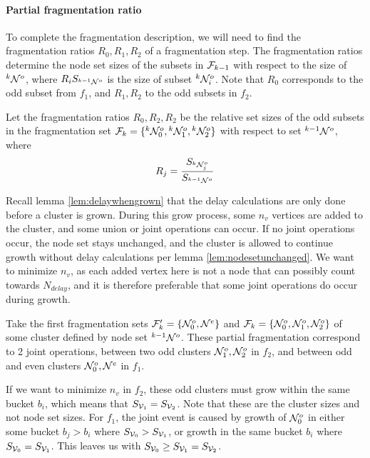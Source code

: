 \paragraph{Partial fragmentation ratio}
To complete the fragmentation description, we will need to find the fragmentation ratios $R_0, R_1, R_2$ of a fragmentation step. The fragmentation ratios determine the node set sizes of the subsets in $\mathcal{F}_{k-1}$ with respect to the size of ${}^{k}\mathcal{N}^o$, where $R_i S_{{}^{k-1}\mathcal{N}^o}$ is the size of subset ${}^{k}\mathcal{N}^o_i$. Note that $R_0$ corresponds to the odd subset from $f_1$, and $R_1, R_2$ to the odd subsets in $f_2$.

\begin{lemma}\label{lem:fragratio}
  Let the fragmentation ratios $R_0, R_2, R_2$ be the relative set sizes of the odd subsets in the fragmentation set $\mathcal{F}_{k} = \{{}^{k}\mathcal{N}^o_0, {}^{k}\mathcal{N}^{o}_1, {}^{k}\mathcal{N}^{o}_2 \}$ with respect to set ${}^{k-1}\mathcal{N}^o$, where
  \begin{equation}\label{eq:fragratio}
    R_j = \frac{S_{{}^{k}\mathcal{N}^o_j}}{S_{{}^{k-1}\mathcal{N}^o}}
  \end{equation}
\end{lemma}

Recall lemma \ref{lem:delaywhengrown} that the delay calculations are only done before a cluster is grown. During this grow process, some $n_v$ vertices are added to the cluster, and some union or joint operations can occur. If no joint operations occur, the node set stays unchanged, and the cluster is allowed to continue growth without delay calculations per lemma \ref{lem:nodesetunchanged}. We want to minimize $n_v$, as each added vertex here is not a node that can possibly count towards $N_{delay}$, and it is therefore preferable that some joint operations do occur during growth.

Take the first fragmentation sets $\mathcal{F}'_{k} = \{\mathcal{N}^o_0, \mathcal{N}^{e} \}$ and $\mathcal{F}_{k} = \{\mathcal{N}^o_0, \mathcal{N}^{o}_1, \mathcal{N}^{o}_2 \}$ of some cluster defined by node set ${}^{k-1}\mathcal{N}^o$. These partial fragmentation correspond to 2 joint operations, between two odd clusters $ \mathcal{N}^{o}_1, \mathcal{N}^{o}_2 $ in $f_2$, and between odd and even clusters $\mathcal{N}^o_0, \mathcal{N}^{e} $ in $f_1$.

If we want to minimize $n_v$ in $f_2$, these odd clusters must grow within the same bucket $b_i$, which means that $S_{\mathcal{V}_1} = S_{\mathcal{V}_2}$. Note that these are the cluster sizes and not node set sizes. For $f_1$, the joint event is caused by growth of $\mathcal{N}^o_0$ in either some bucket $b_j > b_i$ where $ S_{\mathcal{V}_0} > S_{\mathcal{V}_1} $, or growth in the same bucket $b_i$ where $S_{\mathcal{V}_0} = S_{\mathcal{V}_1} $. This leaves us with $S_{\mathcal{V}_0} \geq S_{\mathcal{V}_1} = S_{\mathcal{V}_2}$.

